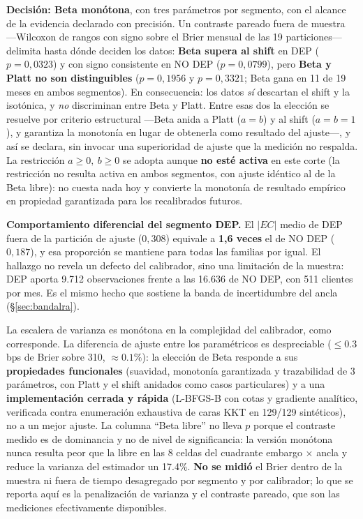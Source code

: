 \documentclass[12pt, a4paper]{article}
\begin{document}
\noindent\textbf{Decisión: Beta monótona}, con tres parámetros por segmento, con el alcance de
la evidencia declarado con precisión. Un contraste pareado fuera de muestra ---Wilcoxon de rangos
con signo sobre el Brier mensual de las 19 particiones--- delimita hasta dónde deciden los datos:
\textbf{Beta supera al shift} en DEP ($p=0{,}0323$) y con signo consistente en NO DEP
($p=0{,}0799$), pero \textbf{Beta y Platt no son distinguibles} ($p=0{,}1956$ y $p=0{,}3321$; Beta
gana en 11 de 19 meses en ambos segmentos). En consecuencia: los datos \emph{sí} descartan el
shift y la isotónica, y \emph{no} discriminan entre Beta y Platt. Entre esas dos la elección se
resuelve por criterio estructural ---Beta anida a Platt ($a=b$) y al shift ($a=b=1$), y garantiza
la monotonía en lugar de obtenerla como resultado del ajuste---, y así se declara, sin invocar una
superioridad de ajuste que la medición no respalda. La restricción
$a\ge0,\ b\ge0$ se adopta aunque \textbf{no esté activa} en este corte
(la restricción no resulta activa en ambos segmentos, con ajuste idéntico al
de la Beta libre): no cuesta nada hoy y convierte la monotonía de resultado empírico en propiedad
garantizada para los recalibrados futuros.

\noindent\textbf{Comportamiento diferencial del segmento DEP.} El $|EC|$ medio de DEP fuera de la
partición de ajuste ($0{,}308$) equivale a \textbf{1,6 veces} el de NO DEP ($0{,}187$), y esa
proporción se mantiene para todas las familias por igual. El hallazgo no revela un defecto del
calibrador, sino una limitación de la muestra: DEP aporta 9.712 observaciones frente a las 16.636
de NO DEP, con 511 clientes por mes. Es el mismo hecho que sostiene la banda de incertidumbre del
ancla (\S\ref{sec:bandalra}).

\noindent La escalera de varianza es monótona en la complejidad del calibrador, como corresponde.
La diferencia de ajuste entre los paramétricos es despreciable ($\le0.3$ bps de Brier sobre 310,
$\approx0.1\%$): la elección de Beta responde a sus \textbf{propiedades funcionales} (suavidad,
monotonía garantizada y trazabilidad de 3 parámetros, con Platt y el shift anidados como casos
particulares) y a una \textbf{implementación cerrada y rápida} (L-BFGS-B con cotas y gradiente
analítico, verificada contra enumeración exhaustiva de caras KKT en 129/129 sintéticos), no a un
mejor ajuste. La columna ``Beta libre'' no lleva $p$ porque el contraste medido es de dominancia y
no de nivel de significancia: la versión monótona nunca resulta peor que la libre en las 8 celdas
del cuadrante embargo $\times$ ancla y reduce la varianza del estimador un 17.4\%. \textbf{No se
midió} el Brier dentro de la muestra ni fuera de tiempo desagregado por segmento y por
calibrador; lo que se reporta aquí es la penalización de varianza y el
contraste pareado, que son las mediciones efectivamente disponibles.
\end{document}
